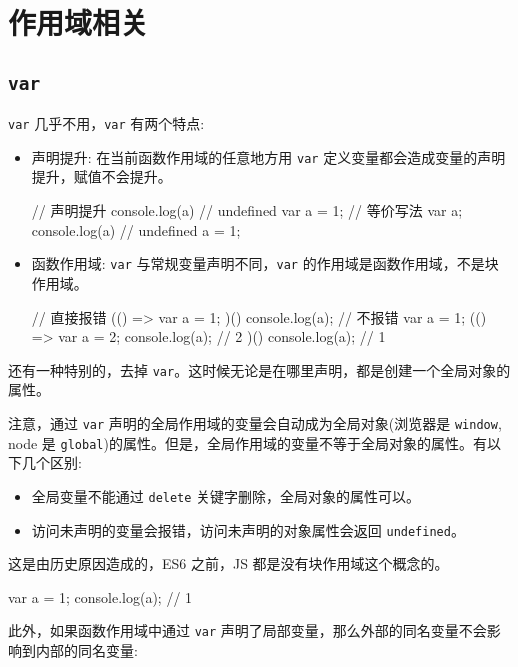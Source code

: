 \section{作用域相关}

\subsection{\texttt{var}}

\texttt{var} 几乎不用，\texttt{var} 有两个特点:
\begin{itemize}
  \item 声明提升: 在当前函数作用域的任意地方用 \texttt{var} 定义变量都会造成变量的声明提升，赋值不会提升。
\begin{JavaScript}
// 声明提升
console.log(a)  // undefined
var a = 1;
// 等价写法
var a;
console.log(a)  // undefined
a = 1;
\end{JavaScript}
  \item 函数作用域: \texttt{var} 与常规变量声明不同，\texttt{var} 的作用域是函数作用域，不是块作用域。
\begin{JavaScript}
// 直接报错
(() => {
  var a = 1;
})()
console.log(a);
// 不报错
var a = 1;
(() => {
  var a = 2;
  console.log(a); // 2
})()
console.log(a); // 1
\end{JavaScript}
\end{itemize}

还有一种特别的，去掉 \texttt{var}。这时候无论是在哪里声明，都是创建一个全局对象的属性。

注意，通过 \texttt{var} 声明的全局作用域的变量会自动成为全局对象(浏览器是 \texttt{window}, node 是 \texttt{global})的属性。但是，全局作用域的变量不等于全局对象的属性。有以下几个区别:

\begin{itemize}
  \item 全局变量不能通过 \texttt{delete} 关键字删除，全局对象的属性可以。
  \item 访问未声明的变量会报错，访问未声明的对象属性会返回 \texttt{undefined}。
\end{itemize}

这是由历史原因造成的，ES6 之前，JS 都是没有块作用域这个概念的。

\begin{JavaScript}
{
  var a = 1;
}
console.log(a); // 1
\end{JavaScript}

此外，如果函数作用域中通过 \texttt{var} 声明了局部变量，那么外部的同名变量不会影响到内部的同名变量:

